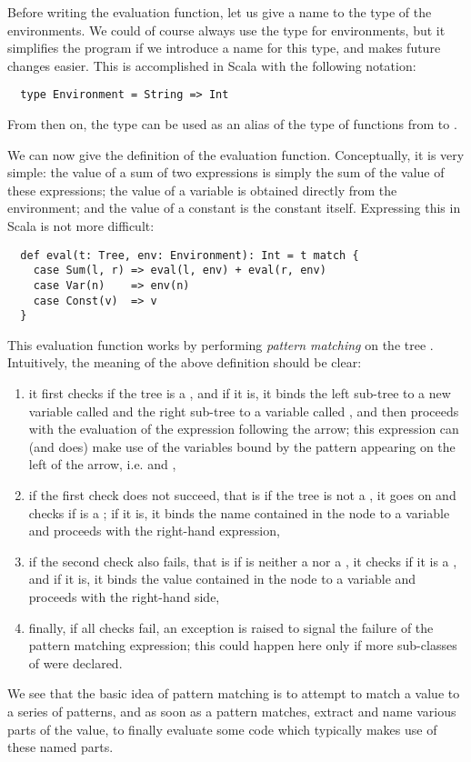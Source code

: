 \documentclass[a4paper,12pt,twoside,titlepage]{article}
\newcommand{\langname}[1]{#1\xspace}
\newcommand{\Scala}{\langname{Scala}}
\begin{document}
Before writing the evaluation function, let us give a name to the type
of the environments. We could of course always use the type
 for environments, but it simplifies the program
if we introduce a name for this type, and makes future changes easier.
This is accomplished in \Scala with the following notation:
\begin{lstlisting}
  type Environment = String => Int
\end{lstlisting}
From then on, the type  can be used as an alias of
the type of functions from  to .

We can now give the definition of the evaluation function.
Conceptually, it is very simple: the value of a sum of two expressions
is simply the sum of the value of these expressions; the value of a
variable is obtained directly from the environment; and the value of a
constant is the constant itself. Expressing this in \Scala is not more
difficult:
\begin{lstlisting}
  def eval(t: Tree, env: Environment): Int = t match {
    case Sum(l, r) => eval(l, env) + eval(r, env)
    case Var(n)    => env(n)
    case Const(v)  => v
  }
\end{lstlisting}
This evaluation function works by performing \emph{pattern matching}
on the tree . Intuitively, the meaning of the above definition
should be clear:
\begin{enumerate}
\item it first checks if the tree  is a , and if it
  is, it binds the left sub-tree to a new variable called  and
  the right sub-tree to a variable called , and then proceeds
  with the evaluation of the expression following the arrow; this
  expression can (and does) make use of the variables bound by the
  pattern appearing on the left of the arrow, i.e.  and
  ,
\item if the first check does not succeed, that is if the tree is not
  a , it goes on and checks if  is a ; if
  it is, it binds the name contained in the  node to a
  variable  and proceeds with the right-hand expression,
\item if the second check also fails, that is if  is neither a
   nor a , it checks if it is a , and
  if it is, it binds the value contained in the  node to a
  variable  and proceeds with the right-hand side,
\item finally, if all checks fail, an exception is raised to signal
  the failure of the pattern matching expression; this could happen
  here only if more sub-classes of  were declared.
\end{enumerate}
We see that the basic idea of pattern matching is to attempt to match
a value to a series of patterns, and as soon as a pattern matches,
extract and name various parts of the value, to finally evaluate some
code which typically makes use of these named parts.
\end{document}
